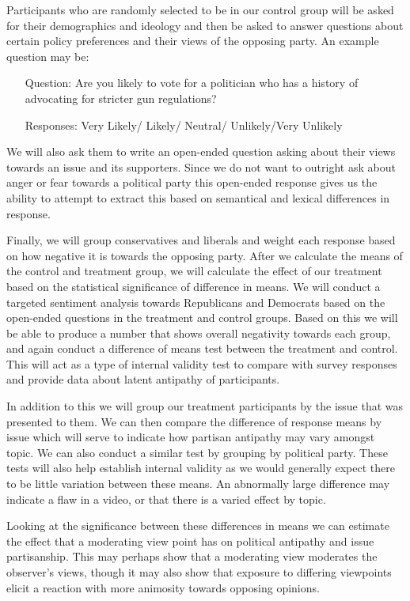 \documentclass[12pt]{article}
\begin{document}
Participants who are randomly selected to be in our control group will be asked for their demographics and ideology and then be asked to answer questions about certain policy preferences and their views of the opposing party. An example question may be:

\begin{enumerate}[leftmargin=*]
	\item[Question:] Are you likely to vote for a politician who has a history of advocating for stricter gun regulations?
	\item[Responses:] Very Likely/ Likely/ Neutral/ Unlikely/Very Unlikely 
\end{enumerate}

We will also ask them to write an open-ended question asking about their views towards an issue and its supporters. Since we do not want to outright ask about anger or fear towards a political party this open-ended response gives us the ability to attempt to extract this based on semantical and lexical differences in response. 

Finally, we will group conservatives and liberals and weight each response based on how negative it is towards the opposing party. After we calculate the means of the control and treatment group, we will calculate the effect of our treatment based on the statistical significance of difference in means. We will conduct a targeted sentiment analysis towards Republicans and Democrats based on the open-ended questions in the treatment and control groups. Based on this we will be able to produce a number that shows overall negativity towards each group, and again conduct a difference of means test between the treatment and control. This will act as a type of internal validity test to compare with survey responses and provide data about latent antipathy of participants. 

In addition to this we will group our treatment participants by the issue that was presented to them. We can then compare the difference of response means by issue which will serve to indicate how partisan antipathy may vary amongst topic. We can also conduct a similar test by grouping by political party. These tests will also help establish internal validity as we would generally expect there to be little variation between these means. An abnormally large difference may indicate a flaw in a video, or that there is a varied effect by topic.  

Looking at the significance between these differences in means we can estimate the effect that a moderating view point has on political antipathy and issue partisanship. This may perhaps show that a moderating view moderates the observer’s views, though it may also show that exposure to differing viewpoints elicit a reaction with more animosity towards opposing opinions. 
\end{document}
